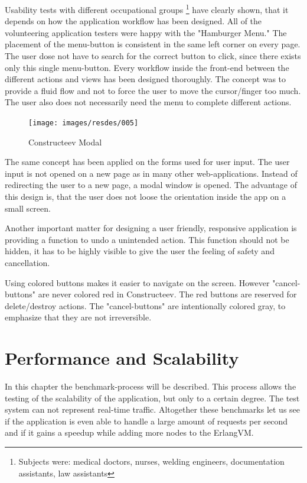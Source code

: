 \textcolor{newcode}{Usability tests with different occupational groups \footnote{Subjects were: medical doctors, nurses, welding engineers, documentation assistants, law assistants} have clearly shown, that it depends on how the application workflow has been designed. All of the volunteering application testers were happy with the "Hamburger Menu." The placement of the menu-button is consistent in the same left corner on every page. The user dose not have to search for the correct button to click, since there exists only this single menu-button.
Every workflow inside the front-end between the different actions and views has been designed thoroughly. The concept was to provide a fluid flow and not to force the user to move the cursor/finger too much. The user also does not necessarily need the menu to complete different actions.}
 \newpage
\begin{figure}
  \caption{Constructeev Modal}
  \centering
    \texttt{[image: images/resdes/005]}
\end{figure}
\textcolor{newcode}{The same concept has been applied on the forms used for user input. The user input is not opened on a new page as in many other web-applications. Instead of redirecting the user to a new page, a modal window is opened. The advantage of this design is, that the user does not loose the orientation inside the app on a small screen.}

\textcolor{newcode}{Another important matter for designing a user friendly, responsive application is providing a function to undo a unintended action. This function should not be hidden, it has to be highly visible to give the user the feeling of safety and cancellation.}

\textcolor{newcode}{Using colored buttons makes it easier to navigate on the screen. However "cancel-buttons" are never colored red in Constructeev. The red buttons are reserved for delete/destroy actions. The "cancel-buttons" are intentionally colored gray, to emphasize that they are not irreversible.}



\chapter{Performance and Scalability} \label{Performance and Scalability}
\label{perf_scale}
In this chapter the benchmark-process will be described.
This process allows the testing of the scalability of the application, but only to a certain degree. The test system can not represent real-time traffic. Altogether these benchmarks let us see if the application is even able to handle a large amount of requests per second and if it gains a speedup while adding more nodes to the ErlangVM.

